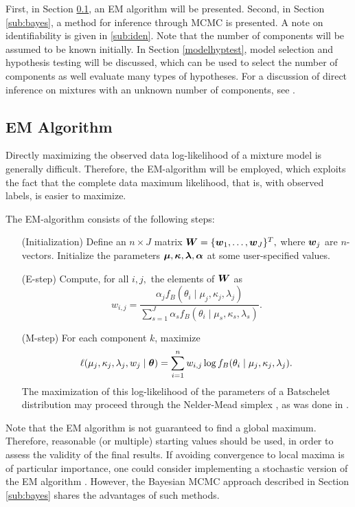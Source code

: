 First, in Section \ref{sub:em}, an EM algorithm will be presented. Second, in Section \ref{sub:bayes}, a method for inference through MCMC is presented. A note on identifiability is given in \ref{sub:iden}. Note that the number of components will be assumed to be known initially. In Section \ref{modelhyptest}, model selection and hypothesis testing will be discussed, which can be used to select the number of components as well evaluate many types of hypotheses. For a discussion of direct inference on mixtures with an unknown number of components, see \citet{richardson1997bayesian}.

\subsection{EM Algorithm}
\label{sub:em}

Directly maximizing the observed data log-likelihood of a mixture model is generally difficult. Therefore, the EM-algorithm will be employed, which exploits the fact that the complete data maximum likelihood, that is, with observed labels, is easier to maximize.

The EM-algorithm consists of the following steps:

\begin{enumerate}
\item[(Initialization)] Define an \(n \times J\) matrix \(\boldsymbol{W} = \{\boldsymbol{w}_1, \dots, \boldsymbol{w}_J\}^T,\) where \(\boldsymbol{w}_j\) are \(n\)-vectors. Initialize the parameters \( \boldsymbol{\mu}, \boldsymbol{\kappa}, \boldsymbol{\lambda}, \boldsymbol{\alpha}\) at some user-specified values.
\item[(E-step)] Compute, for all \(i, j,\) the elements of \(\boldsymbol{W}\) as
\begin{equation}
w_{i, j} = \frac{\alpha_j f_B(\theta_i \mid \mu_j, \kappa_j, \lambda_j)}{\sum_{s = 1}^J \alpha_s f_B(\theta_i \mid \mu_s, \kappa_s, \lambda_s)}.
\end{equation}
\item[(M-step)] For each component \(k\), maximize
\begin{equation}
  \ell(\mu_j, \kappa_j, \lambda_j, w_j \mid \boldsymbol{\theta}) =\sum_{i=1}^n w_{i, j}  \log f_B(\theta_i \mid \mu_j, \kappa_j, \lambda_j).
\end{equation}
The maximization of this log-likelihood of the parameters of a Batschelet distribution may proceed through the Nelder-Mead simplex \citep{nelder1965simplex}, as was done in \citet{jones2012inverse}.
\end{enumerate}

Note that the EM algorithm is not guaranteed to find a global maximum. Therefore, reasonable (or multiple) starting values should be used, in order to assess the validity of the final results. If avoiding convergence to local maxima is of particular importance, one could consider implementing a stochastic version of the EM algorithm \citep{diebolt1996stochastic, nielsen2000stochastic}. However, the Bayesian MCMC approach described in Section \ref{sub:bayes} shares the advantages of such methods.

